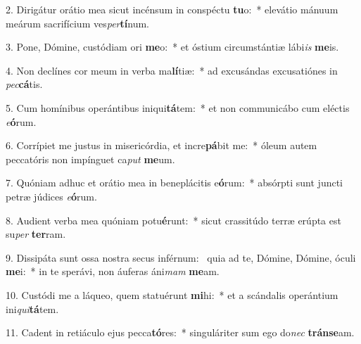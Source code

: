 2. Dirigátur orátio mea sicut incénsum in conspéctu \textbf{tu}o:~*  elevátio mánuum meárum sacrifícium ves\textit{per}\textbf{tí}num.\

3. Pone, Dómine, custódiam ori \textbf{me}o:~*  et óstium circumstántiæ lábi\textit{is} \textbf{me}is.\

4. Non declínes cor meum in verba ma\textbf{lí}tiæ:~*  ad excusándas excusatiónes in \textit{pec}\textbf{cá}tis.\

5. Cum homínibus operántibus iniqui\textbf{tá}tem:~*  et non communicábo cum eléctis \textit{e}\textbf{ó}rum.\

6. Corrípiet me justus in misericórdia, et incre\textbf{pá}bit me:~*  óleum autem peccatóris non impínguet ca\textit{put} \textbf{me}um.\

7. Quóniam adhuc et orátio mea in beneplácitis e\textbf{ó}rum:~*  absórpti sunt juncti petræ júdices \textit{e}\textbf{ó}rum.\

8. Audient verba mea quóniam potu\textbf{é}runt:~*  sicut crassitúdo terræ erúpta est su\textit{per} \textbf{ter}ram.\

9. Dissipáta sunt ossa nostra secus inférnum: \dag\  quia ad te, Dómine, Dómine, óculi \textbf{me}i:~*  in te sperávi, non áuferas áni\textit{mam} \textbf{me}am.\

10. Custódi me a láqueo, quem statuérunt \textbf{mi}hi:~*  et a scándalis operántium ini\textit{qui}\textbf{tá}tem.\

11. Cadent in retiáculo ejus pecca\textbf{tó}res:~*  singuláriter sum ego do\textit{nec} \textbf{tráns}\textbf{e}am.\

